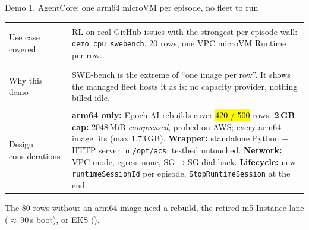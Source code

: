 \begin{frame}{Demo 1, AgentCore: one arm64 microVM per episode, no fleet to run}
\footnotesize
\begin{tabularx}{\textwidth}{@{}>{\bfseries\raggedright\arraybackslash}p{2.4cm}X@{}}
\toprule
Use case covered & RL on real GitHub issues with the strongest per-episode wall: \texttt{demo\_cpu\_swebench}, 20 rows, one VPC microVM Runtime per row.\\
Why this demo & SWE-bench is the extreme of ``one image per row''. It shows the managed fleet hosts it as is: no capacity provider, nothing billed idle.\\
Design considerations & \textbf{arm64 only:} Epoch AI rebuilds cover \hl{420 / 500} rows.\newline
\textbf{2\,GB cap:} 2048\,MiB \emph{compressed}, probed on AWS; every arm64 image fits (max 1.73\,GB).\newline
\textbf{Wrapper:} standalone Python + HTTP server in \texttt{/opt/acs}; testbed untouched.\newline
\textbf{Network:} VPC mode, egress none, SG$\rightarrow$SG dial-back.\newline
\textbf{Lifecycle:} new \texttt{runtimeSessionId} per episode, \texttt{StopRuntimeSession} at the end.\\
\bottomrule
\end{tabularx}
\par\vspace{2mm}
{\scriptsize\color{inkmuted}The 80 rows without an arm64 image need a rebuild, the retired m5 Instance lane ($\approx$\,90\,s boot), or EKS ().\par}
\end{frame}

